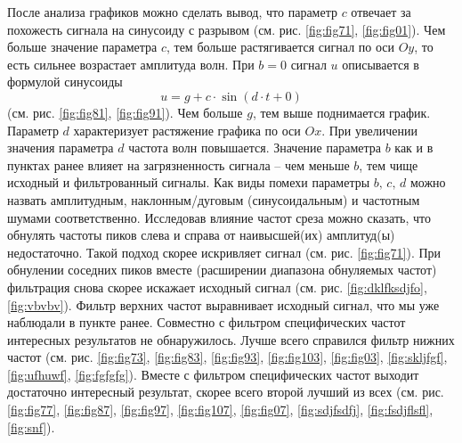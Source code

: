 \documentclass[a4paper, 12pt]{article}
\begin{document}
    
    После анализа графиков можно сделать вывод, что параметр $c$ отвечает за похожесть сигнала на синусоиду с разрывом
    (см. рис. \ref{fig:fig71}, \ref{fig:fig01}). Чем больше значение параметра $c$,
    тем больше растягивается сигнал по оси $Oy$, то есть сильнее возрастает амплитуда волн. При $b=0$ сигнал $u$ описывается
    в формулой синусоиды $$u=g+c\cdot\sin{(d\cdot t+0)}$$ (см. рис. \ref{fig:fig81}, \ref{fig:fig91}). Чем больше $g$, тем выше поднимается график.
    Параметр $d$ характеризует растяжение графика по оси $Ox$. При увеличении значения параметра $d$ частота волн повышается.
    Значение параметра $b$ как и в пунктах ранее влияет на загрязненность сигнала -- чем меньше $b$, тем чище исходный и фильтрованный сигналы.
    Как виды помехи параметры $b,\,c,\,d$ можно назвать амплитудным, наклонным/дуговым (синусоидальным) и частотным шумами соответственно.
    Исследовав влияние частот среза можно сказать, что обнулять частоты пиков слева и справа от наивысшей(их) амплитуд(ы) недостаточно. Такой
    подход скорее искривляет сигнал (см. рис. \ref{fig:fig71}). При обнулении соседних пиков вместе (расширении диапазона обнуляемых
    частот) фильтрация снова скорее искажает исходный сигнал (см. рис. \ref{fig:dklfksdjfo}, \ref{fig:vbvbv}). Фильтр верхних частот выравнивает исходный сигнал,
    что мы уже наблюдали в пункте ранее. Совместно с фильтром специфических частот интересных результатов не обнаружилось. Лучше всего справился фильтр нижних
    частот (см. рис. \ref{fig:fig73}, \ref{fig:fig83}, \ref{fig:fig93}, \ref{fig:fig103}, \ref{fig:fig03}, \ref{fig:skljfgf}, \ref{fig:ufhuwf}, \ref{fig:fgfgfg}).
    Вместе с фильтром специфических частот выходит достаточно интересный результат, скорее всего второй лучший из всех (см. рис. \ref{fig:fig77}, \ref{fig:fig87},
    \ref{fig:fig97}, \ref{fig:fig107}, \ref{fig:fig07}, \ref{fig:sdjfsdfj}, \ref{fig:fsdjflsfl}, \ref{fig:snf}).
\end{document}
